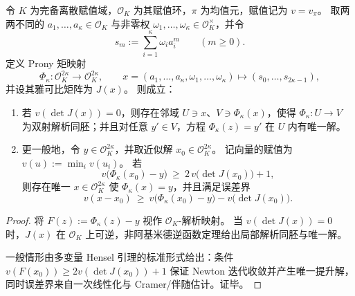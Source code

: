 \begin{theorem}\label{thm:xi-nonarchimedean-prony-hensel-newton-inversion}
令 \(K\) 为完备离散赋值域，\(\mathcal O_K\) 为其赋值环，\(\pi\) 为均值元，赋值记为 \(v=v_\pi\)。
取两两不同的 \(a_1,\dots,a_\kappa\in\mathcal O_K\) 与非零权 \(\omega_1,\dots,\omega_\kappa\in\mathcal O_K^\times\)，并令
\[
s_m:=\sum_{i=1}^{\kappa}\omega_i a_i^{m}\qquad(m\ge 0).
\]
定义 Prony 矩映射
\[
\Phi_{\kappa}:\mathcal O_K^{2\kappa}\longrightarrow \mathcal O_K^{2\kappa},\qquad
x=(a_1,\dots,a_\kappa,\omega_1,\dots,\omega_\kappa)\longmapsto (s_0,\dots,s_{2\kappa-1}),
\]
并设其雅可比矩阵为 \(J(x)\)。
则成立：
\begin{enumerate}
  \item 若 \(v(\det J(x))=0\)，则存在邻域 \(U\ni x\)、\(V\ni \Phi_\kappa(x)\)，使得 \(\Phi_\kappa:U\to V\) 为双射解析同胚；并且对任意 \(y'\in V\)，方程 \(\Phi_\kappa(z)=y'\) 在 \(U\) 内有唯一解。
  \item 更一般地，令 \(y\in\mathcal O_K^{2\kappa}\)，并取近似解 \(x_0\in\mathcal O_K^{2\kappa}\)。
  记向量的赋值为 \(v(u):=\min_i v(u_i)\)。
  若
  \[
  v\!\bigl(\Phi_\kappa(x_0)-y\bigr)\ \ge\ 2\,v\!\bigl(\det J(x_0)\bigr)+1,
  \]
  则存在唯一 \(x\in\mathcal O_K^{2\kappa}\) 使 \(\Phi_\kappa(x)=y\)，并且满足误差界
  \[
  v(x-x_0)\ \ge\ v\!\bigl(\Phi_\kappa(x_0)-y\bigr)-v\!\bigl(\det J(x_0)\bigr).
  \]
\end{enumerate}
\end{theorem}
\begin{proof}
将 \(F(z):=\Phi_\kappa(z)-y\) 视作 \(\mathcal O_K\)-解析映射。
当 \(v(\det J(x))=0\) 时，\(J(x)\) 在 \(\mathcal O_K\) 上可逆，非阿基米德逆函数定理给出局部解析同胚与唯一解。
\par
一般情形由多变量 Hensel 引理的标准形式给出：条件
\(
v(F(x_0))\ge 2v(\det J(x_0))+1
\)
保证 Newton 迭代收敛并产生唯一提升解，同时误差界来自一次线性化与 Cramer/伴随估计。证毕。
\end{proof}
